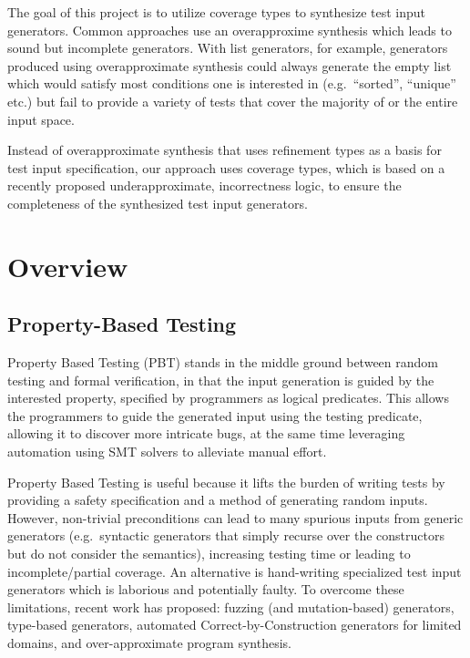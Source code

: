 \documentclass[review, sigplan]{acmart}
\begin{document}
The goal of this project is to utilize coverage types to synthesize test input generators.
Common approaches use an overapproxime synthesis which leads to sound but incomplete generators.
With list generators, for example, generators produced using overapproximate synthesis could always generate the empty list which would satisfy most conditions one is interested in (e.g.~``sorted'', ``unique'' etc.) but fail to provide a variety of tests that cover the majority of or the entire input space.

Instead of overapproximate synthesis that uses refinement types as a basis for test input specification, our approach uses coverage types\citep{Poirot}, which is based on a recently proposed underapproximate, incorrectness logic\citep{IL}, to ensure the completeness of the synthesized test input generators.

\section{Overview}

\subsection{Property-Based Testing}

Property Based Testing (PBT) stands in the middle ground between random testing and formal verification, in that the input generation is guided by the interested property, specified by programmers as logical predicates. This allows the programmers to guide the generated input using the testing predicate, allowing it to discover more intricate bugs, at the same time leveraging automation using SMT solvers to alleviate manual effort.

Property Based Testing  is useful because it lifts the burden of writing tests by providing a safety specification and a method of generating random inputs.
However, non-trivial preconditions can lead to many spurious inputs from generic generators (e.g.~syntactic generators that simply recurse over the constructors but do not consider the semantics), increasing testing time or leading to incomplete/partial coverage.
An alternative is hand-writing specialized test input generators which is laborious and potentially faulty.
To overcome these limitations, recent work has proposed: fuzzing (and mutation-based) generators, type-based generators, automated Correct-by-Construction generators for limited domains, and over-approximate program synthesis.
\end{document}
